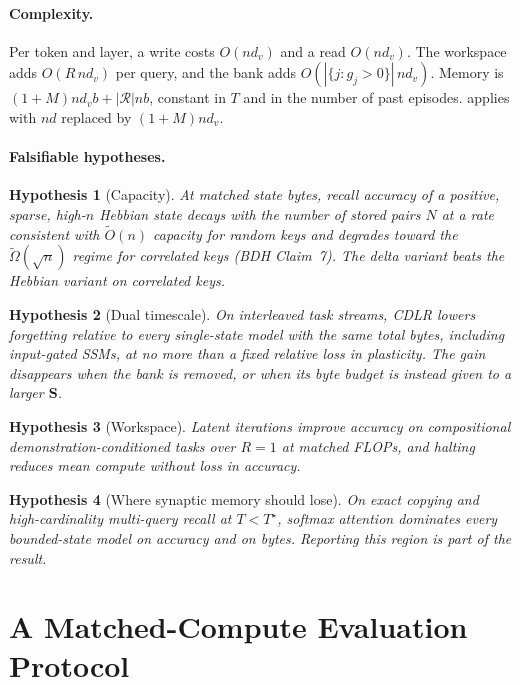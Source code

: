 \documentclass[11pt]{article}
\newtheorem{hypothesis}{Hypothesis}
\theoremstyle{remark}
\newcommand{\Sm}{\mathbf{S}}
\newcommand{\cdlr}{\textsc{CDLR}}
\begin{document}
\paragraph{Complexity.} Per token and layer, a write costs $O(nd_v)$ and a read $O(nd_v)$. The workspace adds
$O(R\,nd_v)$ per query, and the bank adds $O(|\{j:g_j>0\}|\,nd_v)$. Memory is $(1+M)nd_v b+|\mathcal{R}|nb$,
constant in $T$ and in the number of past episodes.  applies with $n d$ replaced by $(1+M)nd_v$.

\paragraph{Falsifiable hypotheses.}
\begin{hypothesis}[Capacity]\label{h:cap}
At matched state bytes, recall accuracy of a positive, sparse, high-$n$ Hebbian state decays with the number of
stored pairs $N$ at a rate consistent with $\tilde O(n)$ capacity for random keys and degrades toward the
$\tilde\Omega(\sqrt n)$ regime for correlated keys (BDH Claim~7). The delta variant beats the Hebbian variant on
correlated keys.
\end{hypothesis}
\begin{hypothesis}[Dual timescale]\label{h:dual}
On interleaved task streams, \cdlr{} lowers forgetting relative to every single-state model with the same total
bytes, including input-gated SSMs, at no more than a fixed relative loss in plasticity. The gain disappears when
the bank is removed, or when its byte budget is instead given to a larger $\Sm$.
\end{hypothesis}
\begin{hypothesis}[Workspace]\label{h:ws}
Latent iterations improve accuracy on compositional demonstration-conditioned tasks over $R=1$ at matched FLOPs,
and halting reduces mean compute without loss in accuracy.
\end{hypothesis}
\begin{hypothesis}[Where synaptic memory should lose]\label{h:lose}
On exact copying and high-cardinality multi-query recall at $T<T^\star$, softmax attention dominates every
bounded-state model on accuracy and on bytes. Reporting this region is part of the result.
\end{hypothesis}

\section{A Matched-Compute Evaluation Protocol}
\label{sec:protocol}
\end{document}
